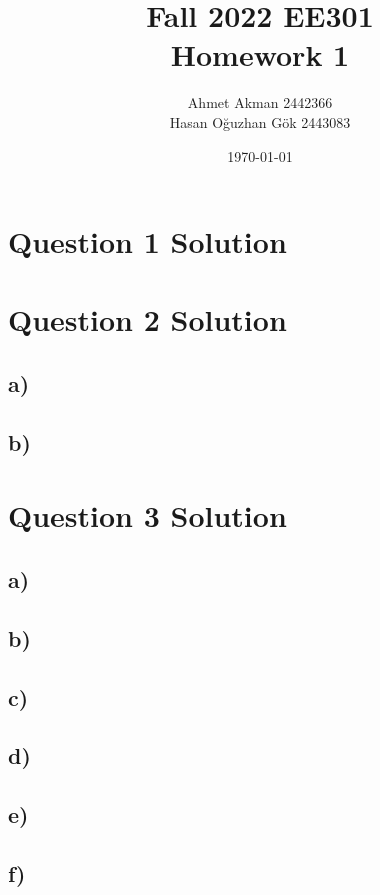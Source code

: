 \documentclass[letterpaper,12pt]{article}
\begin{document}
\thispagestyle{empty}

\title{Fall 2022 EE301  \protect\\ Homework 1}
\author{Ahmet Akman 2442366 \protect\\ Hasan Oğuzhan Gök 2443083 }
\date{\today}
\maketitle
\tableofcontents
\section{Question 1 Solution}

\section{Question 2 Solution}
\subsection{a)}

\subsection{b)}
\section{Question 3 Solution}
\subsection{a)}
\subsection{b)}
\subsection{c)}
\subsection{d)}
\subsection{e)}
\subsection{f)}
\end{document}
